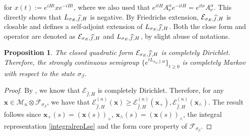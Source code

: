 \documentclass[11pt]{amsart}
\newcommand{\1}{\mathbbm{1}}
\theoremstyle{plain}
\newtheorem{proposition}[theorem]{Proposition}
\theoremstyle{definition}
\theoremstyle{remark}
\numberwithin{equation}{section}
\begin{document}
for $x(t):=e^{iHt}x e^{-iHt}$, where we also used that $e^{it H}A^\alpha_\nu e^{-itH}=e^{it\nu}A^\alpha_\nu$. This directly shows that $L_{\smash{\sigma_E,\widehat{f},H}}$ is negative. By Friedrichs extension, $\mathcal{E}_{\smash{\sigma_E,\widehat{f},H}}$ is closable and defines a self-adjoint extension of $L_{\smash{\sigma_E,\widehat{f},H}}$. Both the close form and operator are denoted as $\mathcal{E}_{\smash{\sigma_E,\widehat{f},H}}$ and $L_{\smash{\sigma_E,\widehat{f},H}}$, by slight abuse of notations. 
\begin{proposition}\label{prop.QMSforLinsigmaEappendix}
The closed quadratic form $\mathcal{E}_{\smash{\sigma_E,\widehat{f},H}}$ is completely Dirichlet. Therefore, the strongly continuous semigroup $\{e^{tL_{\sigma_E,\widehat{f},H}}\}_{t\ge 0}$ is completely Markov with respect to the state $\sigma_\beta$.
\end{proposition}





\begin{proof}

By , we know that $\mathcal{E}_{\widehat{f},H}$ is completely Dirichlet. Therefore, for any $\mathbf{x}\in\mathscr{M}_n\otimes  \mathscr{F}_{\sigma_\beta}$, we have that $\mathcal{E}^{(n)}_{\widehat{f},H}(\mathbf{x})\ge \mathcal{E}_{\widehat{f},H}^{(n)}(\mathbf{x}_+),\mathcal{E}_{\widehat{f},H}^{(n)}(\mathbf{x}_\wedge)$. The result follows since $\mathbf{x}_+(s)=(\mathbf{x}(s))_+$, $\mathbf{x}_\wedge(s)=(\mathbf{x}(s))_\wedge$, the integral representation \eqref{integralrepLse} and the form core property of $\mathscr{F}_{\sigma_\beta}$.

\end{proof}
\end{document}
